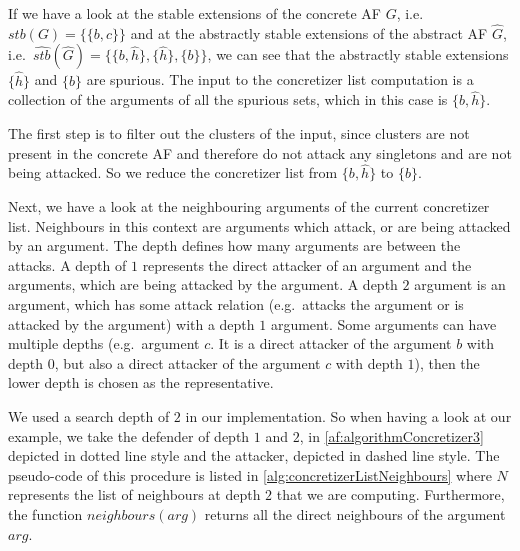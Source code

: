 If we have a look at the stable extensions of the concrete AF $G$, i.e.\ 
$stb(G) = \bigl\{\{b, c\}\bigl\}$ and at the abstractly stable extensions of the abstract AF $\hat{G}$, i.e.\ 
$\hat{stb}(\hat{G}) = \bigl\{\{b, \hat{h}\}, \{\hat{h}\}, \{b\}\bigl\}$, we can see that the abstractly stable extensions $\{\hat{h}\}$ and $\{b\}$ are spurious. The input to the concretizer list computation is a collection of the arguments of all the spurious sets, which in this case is $\{b, \hat{h}\}$.

The first step is to filter out the clusters of the input, since clusters are not present in the concrete AF and therefore do not attack any singletons and are not being attacked. So we reduce the concretizer list from $\{b, \hat{h}\}$ to $\{b\}$.

Next, we have a look at the neighbouring arguments of the current concretizer list.  Neighbours in this context are arguments which attack, or are being attacked by an argument. The depth defines how many arguments are between the attacks. A depth of $1$ represents the direct attacker of an argument and the arguments, which are being attacked by the argument. A depth $2$ argument is an argument, which has some attack relation (e.g.\ attacks the argument or is attacked by the argument) with a depth $1$ argument. Some arguments can have multiple depths (e.g.\ argument $c$. It is a direct attacker of the argument $b$ with depth $0$, but also a direct attacker of the argument $c$ with depth $1$), then the lower depth is chosen as the representative.

We used a search depth of $2$ in our implementation. So when having a look at our example, we take the defender of depth $1$ and $2$, in \cref{af:algorithmConcretizer3} depicted in dotted line style and the attacker, depicted in dashed line style. The pseudo-code of this procedure is listed in \cref{alg:concretizerListNeighbours} where $N$ represents the list of neighbours at depth $2$ that we are computing. Furthermore, the function $neighbours(arg)$ returns all the direct neighbours of the argument $arg$.



